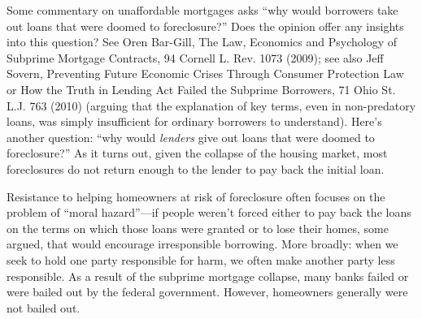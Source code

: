 
\item Some commentary on unaffordable mortgages asks ``why would borrowers take
out loans that were doomed to foreclosure?''  Does the opinion offer any
insights into this question?  See Oren Bar-Gill, The Law, Economics and
Psychology of Subprime Mortgage Contracts, 94 Cornell L. Rev. 1073 (2009); see
also Jeff Sovern, Preventing Future Economic Crises Through Consumer Protection
Law or How the Truth in Lending Act Failed the Subprime Borrowers, 71 Ohio St.
L.J. 763 (2010) (arguing that the explanation of key terms, even in
non-predatory loans, was simply insufficient for ordinary borrowers to
understand).  Here's another question: ``why would \textit{lenders} give out
loans that were doomed to foreclosure?''  As it turns out, given the collapse
of the housing market, most foreclosures do not return enough to the lender to
pay back the initial loan.


\item Resistance to helping homeowners at risk of foreclosure often focuses on
the problem of ``moral hazard''---if people weren't forced either to pay back
the loans on the terms on which those loans were granted or to lose their
homes, some argued, that would encourage irresponsible borrowing.  More
broadly: when we seek to hold one party responsible for harm, we often make
another party less responsible.  As a result of the subprime mortgage collapse,
many banks failed or were bailed out by the federal government.  However,
homeowners generally were not bailed out.

